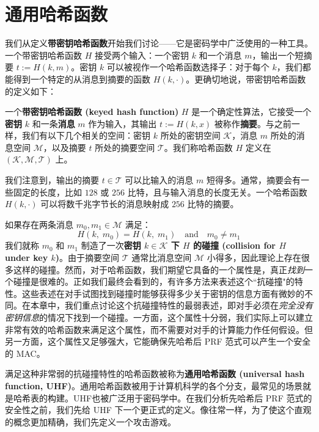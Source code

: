 \section{通用哈希函数}\label{sec:7-1}

我们从定义\textbf{带密钥哈希函数}开始我们讨论——它是密码学中广泛使用的一种工具。一个带密钥哈希函数 $H$ 接受两个输入：一个密钥 $k$ 和一个消息 $m$，输出一个短摘要 $t:=H(k,m)$。密钥 $k$ 可以被视作一个哈希函数选择子：对于每个 $k$，我们都能得到一个特定的从消息到摘要的函数 $H(k,\cdot)$。更确切地说，带密钥哈希函数的定义如下：

\begin{definition}[带密钥哈希函数]
一个\textbf{带密钥哈希函数 (keyed hash function)} $H$ 是一个确定性算法，它接受一个\textbf{密钥} $k$ 和一条\textbf{消息} $m$ 作为输入，其输出 $t:=H(k,x)$ 被称作\textbf{摘要}。与之前一样，我们有以下几个相关的空间：密钥 $k$ 所处的密钥空间 $\mathcal{K}$，消息 $m$ 所处的消息空间 $\mathcal{M}$，以及摘要 $t$ 所处的摘要空间 $\mathcal{T}$。我们称哈希函数 $H$ 定义在 $(\mathcal{K},\mathcal{M},\mathcal{T})$ 上。
\end{definition}

我们注意到，输出的摘要 $t\in\mathcal{T}$ 可以比输入的消息 $m$ 短得多。通常，摘要会有一些固定的长度，比如 $128$ 或 $256$ 比特，且与输入消息的长度无关。一个哈希函数 $H(k,\cdot)$ 可以将数千兆字节长的消息映射成 $256$ 比特的摘要。

如果存在两条消息 $m_0,m_1\in\mathcal{M}$ 满足：
\[
H(k,\;m_0)=H(k,\;m_1)
\quad\text{and}\quad
m_0\neq m_1
\]
我们就称 $m_0$ 和 $m_1$ 制造了一次\textbf{密钥 $k\in\mathcal{K}$ 下 $H$ 的碰撞 (collision for $H$ under key $k$)}。由于摘要空间 $\mathcal{T}$ 通常比消息空间 $\mathcal{M}$ 小得多，因此理论上存在很多这样的碰撞。然而，对于哈希函数，我们期望它具备的一个属性是，真正\emph{找到}一个碰撞是很难的。正如我们最终会看到的，有许多方法来表述这个``抗碰撞"的特性。这些表述在对手试图找到碰撞时能够获得多少关于密钥的信息方面有微妙的不同。在本章中，我们重点讨论这个抗碰撞特性的最弱表述，即对手必须在\emph{完全没有密钥信息}的情况下找到一个碰撞。一方面，这个属性十分弱，我们实际上可以建立非常有效的哈希函数来满足这个属性，而不需要对对手的计算能力作任何假设。但另一方面，这个属性又足够强大，它能确保先哈希后 PRF 范式可以产生一个安全的 MAC。

满足这种非常弱的抗碰撞特性的哈希函数被称为\textbf{通用哈希函数 (universal hash function, UHF)}。通用哈希函数被用于计算机科学的各个分支，最常见的场景就是哈希表的构建。UHF也被广泛用于密码学中。在我们分析先哈希后 PRF 范式的安全性之前，我们先给 UHF 下一个更正式的定义。像往常一样，为了使这个直观的概念更加精确，我们先定义一个攻击游戏。

